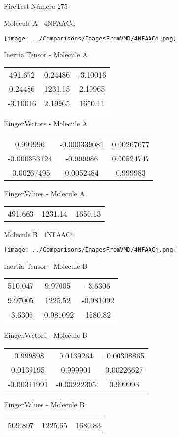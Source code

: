 \vtab[-3cm]
\begin{center}
{\large FireTest \tab Número 275}
\end{center}
\begin{multicols}{2}
\begin{center}

Molecule A \
4NFAACd

\texttt{[image: ../Comparisons/ImagesFromVMD/4NFAACd.png]}

Inertia Tensor - Molecule A \\
\begin{tabular}{|c c c|}
491.672	 & 	0.24486	 & 	-3.10016	 \\
0.24486	 & 	1231.15	 & 	2.19965	 \\
-3.10016	 & 	2.19965	 & 	1650.11
\end{tabular}

\vtab
 EingenVectors - Molecule A     \\
\begin{tabular}{|c c c|}
0.999996	 & 	-0.000339081	 & 	0.00267677	 \\
-0.000353124	 & 	-0.999986	 & 	0.00524747	 \\
-0.00267495	 & 	0.0052484	 & 	0.999983
\end{tabular}

\vtab
 EingenValues - Molecule A     \\
\begin{tabular}{|c c c|}
491.663	 & 	1231.14	 & 	1650.13	 \\
\end{tabular}
\columnbreak

Molecule B \
4NFAACj

\texttt{[image: ../Comparisons/ImagesFromVMD/4NFAACj.png]}

Inertia Tensor - Molecule B \\
\begin{tabular}{|c c c|}
510.047	 & 	9.97005	 & 	-3.6306	 \\
9.97005	 & 	1225.52	 & 	-0.981092	 \\
-3.6306	 & 	-0.981092	 & 	1680.82
\end{tabular}

\vtab
 EingenVectors - Molecule B     \\
\begin{tabular}{|c c c|}
-0.999898	 & 	0.0139264	 & 	-0.00308865	 \\
0.0139195	 & 	0.999901	 & 	0.00226627	 \\
-0.00311991	 & 	-0.00222305	 & 	0.999993
\end{tabular}

\vtab
 EingenValues - Molecule B     \\
\begin{tabular}{|c c c|}
509.897	 & 	1225.65	 & 	1680.83	 \\
\end{tabular}

\end{center}
\end{multicols}

